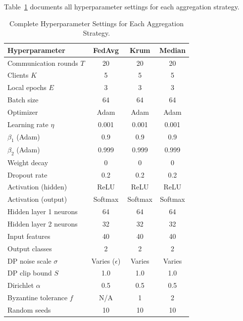 \documentclass[conference]{IEEEtran}
\begin{document}
Table~\ref{tab:hyperparams} documents all hyperparameter settings for
each aggregation strategy.

\begin{table}[htbp]
\centering
\caption{Complete Hyperparameter Settings for Each Aggregation Strategy.}
\label{tab:hyperparams}
\setlength{\tabcolsep}{5pt}
\begin{tabular}{lccc}
\toprule
\textbf{Hyperparameter} & \textbf{FedAvg} & \textbf{Krum} & \textbf{Median} \\
\midrule
Communication rounds $T$    & 20    & 20    & 20    \\
Clients $K$                 & 5     & 5     & 5     \\
Local epochs $E$            & 3     & 3     & 3     \\
Batch size                  & 64    & 64    & 64    \\
Optimizer                   & Adam  & Adam  & Adam  \\
Learning rate $\eta$        & 0.001 & 0.001 & 0.001 \\
$\beta_1$ (Adam)            & 0.9   & 0.9   & 0.9   \\
$\beta_2$ (Adam)            & 0.999 & 0.999 & 0.999 \\
Weight decay                & $0$   & $0$   & $0$   \\
Dropout rate                & 0.2   & 0.2   & 0.2   \\
Activation (hidden)         & ReLU  & ReLU  & ReLU  \\
Activation (output)         & Softmax & Softmax & Softmax \\
Hidden layer 1 neurons      & 64    & 64    & 64    \\
Hidden layer 2 neurons      & 32    & 32    & 32    \\
Input features              & 40    & 40    & 40    \\
Output classes              & 2     & 2     & 2     \\
DP noise scale $\sigma$     & Varies ($\epsilon$) & Varies & Varies \\
DP clip bound $S$           & 1.0   & 1.0   & 1.0   \\
Dirichlet $\alpha$          & 0.5   & 0.5   & 0.5   \\
Byzantine tolerance $f$     & N/A   & 1     & 2     \\
Random seeds                & 10    & 10    & 10    \\
\bottomrule
\end{tabular}
\end{table}
\end{document}

